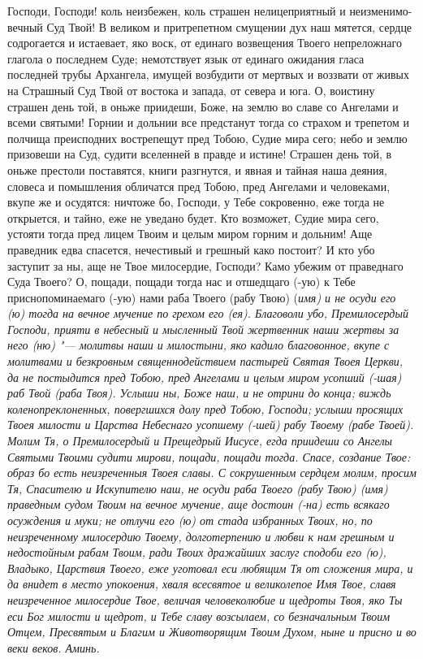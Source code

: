 Господи, Господи! коль неизбежен, коль страшен нелицеприятный и неизменимо-вечный Суд Твой! В великом и притрепетном смущении дух наш мятется, сердце содрогается и истаевает, яко воск, от единаго возвещения Твоего непреложнаго глагола о последнем Суде; немотствует язык от единаго ожидания гласа последней трубы Архангела, имущей возбудити от мертвых и воззвати от живых на Страшный Суд Твой от востока и запада, от севера и юга. О, воистину страшен день той, в оньже приидеши, Боже, на землю во славе со Ангелами и всеми святыми! Горнии и дольнии все предстанут тогда со страхом и трепетом и полчища преисподних вострепещут пред Тобою, Судие мира сего; небо и землю призовеши на Суд, судити вселенней в правде и истине! Страшен день той, в оньже престоли поставятся, книги разгнутся, и явная и тайная наша деяния, словеса и помышления обличатся пред Тобою, пред Ангелами и человеками, вкупе же и осудятся: ничтоже бо, Господи, у Тебе сокровенно, еже тогда не открыется, и тайно, еже не уведано будет. Кто возможет, Судие мира сего, устояти тогда пред лицем Твоим и целым миром горним и дольним! Аще праведник едва спасется, нечестивый и грешный како постоит? И кто убо заступит за ны, аще не Твое милосердие, Господи? Камо убежим от праведнаго Суда Твоего? О, пощади, пощади тогда нас и отшедщаго (-ую) к Тебе приснопоминаемаго (-ую) нами раба Твоего (рабу Твою) (\itshape имя\normalfont{}) и не осуди его (ю) тогда на вечное мучение по грехом его (ея). Благоволи убо, Премилосердый Господи, прияти в небесный и мысленный Твой жертвенник наши жертвы за него (ню) "--- молитвы наши и милостыни, яко кадило благовонное, вкупе с молитвами и безкровным священнодействием пастырей Святая Твоея Церкви, да не постыдится пред Тобою, пред Ангелами и целым миром усопший (-шая) раб Твой (раба Твоя). Услыши ны, Боже наш, и не отрини до конца; виждь коленопреклоненных, повергшихся долу пред Тобою, Господи; услыши просящих Твоея милости и Царства Небеснаго усопшему (-шей) рабу Твоему (рабе Твоей). Молим Тя, о Премилосердый и Прещедрый Иисусе, егда приидеши со Ангелы Святыми Твоими судити мирови, пощади, пощади тогда. Спасе, создание Твое: образ бо есть неизреченныя Твоея славы. С сокрушенным сердцем молим, просим Тя, Спасителю и Искупителю наш, не осуди раба Твоего (рабу Твою) (\itshape имя\normalfont{}) праведным судом Твоим на вечное мучение, аще достоин (-на) есть всякаго осуждения и муки; не отлучи его (ю) от стада избранных Твоих, но, по неизреченному милосердию Твоему, долготерпению и любви к нам грешным и недостойным рабам Твоим, ради Твоих дражайших заслуг сподоби его (ю), Владыко, Царствия Твоего, еже уготовал еси любящим Тя от сложения мира, и да внидет в место упокоения, хваля всесвятое и великолепое Имя Твое, славя неизреченное милосердие Твое, величая человеколюбие и щедроты Твоя, яко Ты еси Бог милости и щедрот, и Тебе славу возсылаем, со безначальным Твоим Отцем, Пресвятым и Благим и Животворящим Твоим Духом, ныне и присно и во веки веков. Аминь. 



